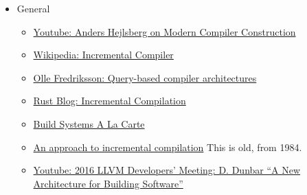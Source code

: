 \begin{itemize}[noitemsep]

\item General
  \begin{itemize}[noitemsep]
  \item \href{https://www.youtube.com/watch?v=wSdV1M7n4gQ}{\CheckedBox Youtube: Anders Hejlsberg on Modern Compiler Construction} \cite{hejlsberg_modern_compiler_construction}
  \item \href{https://en.wikipedia.org/wiki/Incremental_compiler}{\CheckedBox Wikipedia: Incremental Compiler} \cite{wiki_incremental_compiler}
  \item \href{https://ollef.github.io/blog/posts/query-based-compilers.html}{\CheckedBox Olle Fredriksson: Query-based compiler architectures} \cite{olle_query_based}
  \item \href{https://blog.rust-lang.org/2016/09/08/incremental.html}{\CheckedBox Rust Blog: Incremental Compilation} \cite{rust_blog_incremental_compilation}
  \item \href{https://www.microsoft.com/en-us/research/publication/build-systems-la-carte/}{\Square Build Systems A La Carte} \cite{mokhov2018build}
  \item \href{https://dl.acm.org/doi/10.1145/502949.502889}{\CheckedBox An approach to incremental compilation}
    This is old, from 1984.
  \item \href{https://www.youtube.com/watch?v=b_T-eCToX1I}{\Square Youtube: 2016 LLVM Developers’ Meeting: D. Dunbar “A New Architecture for Building Software”} \cite{dunbar2016}
  \end{itemize}


\end{itemize}
